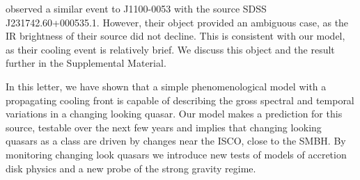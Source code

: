 \documentclass{nature}
\begin{document}
\cite{Guo2016} observed a similar event to J1100-0053 with the source
SDSS J231742.60+000535.1. However, their object provided an ambiguous
case, as the IR brightness of their source did not decline. This is consistent with our model, as their cooling event is
relatively brief.  We discuss this object and the \cite{Guo2016} result
further in the Supplemental Material. 

In this letter, we have shown that a simple phenomenological model
with a propagating cooling front is capable of describing the gross
spectral and temporal variations in a changing looking quasar. Our
model makes a prediction for this source, testable over the next few
years and implies that changing looking quasars as a class are driven
by changes near the ISCO, close to the SMBH. By monitoring changing
look quasars we introduce new tests of models of accretion disk
physics and a new probe of the strong gravity regime.





%

\end{document}
